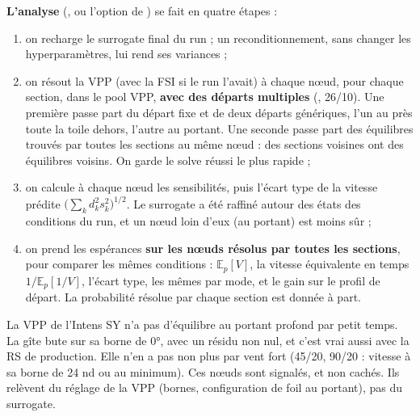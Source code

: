 \documentclass[10pt,a4paper]{article}
\begin{document}
\textbf{L'analyse} (, ou l'option  de ) se
fait en quatre étapes :
\begin{enumerate}
  \item on recharge le surrogate final du run ; un reconditionnement, sans changer les hyperparamètres, lui
        rend ses variances ;
  \item on résout la VPP (avec la FSI si le run l'avait) à chaque nœud, pour chaque section, dans le pool
        VPP, \textbf{avec des départs multiples} (, 26/10). Une première passe part du
        départ fixe et de deux départs génériques, l'un au près toute la toile dehors, l'autre au portant.
        Une seconde passe part des équilibres trouvés par toutes les sections au même nœud : des sections
        voisines ont des équilibres voisins. On garde le solve réussi le plus rapide ;
  \item on calcule à chaque nœud les sensibilités, puis l'écart type de la vitesse prédite
        $\big(\sum_k d_k^2 s_k^2\big)^{1/2}$. Le surrogate a été raffiné autour des états des conditions du
        run, et un nœud loin d'eux (au portant) est moins sûr ;
  \item on prend les espérances \textbf{sur les nœuds résolus par toutes les sections}, pour comparer les
        mêmes conditions : $\mathbb{E}_p[V]$, la vitesse équivalente en temps $1/\mathbb{E}_p[1/V]$, l'écart
        type, les mêmes par mode, et le gain sur le profil de départ. La probabilité résolue par chaque
        section est donnée à part.
\end{enumerate}

\begin{subtilite}
La VPP de l'Intens SY n'a pas d'équilibre au portant profond par petit temps. La gîte bute sur sa borne de
0°, avec un résidu non nul, et c'est vrai aussi avec la RS de production. Elle n'en a pas non plus par vent
fort (45/20, 90/20 : vitesse à sa borne de 24 nd ou  au minimum). Ces nœuds sont signalés, et non
cachés. Ils relèvent du réglage de la VPP (bornes, configuration de foil au portant), pas du surrogate.
\end{subtilite}
\end{document}
